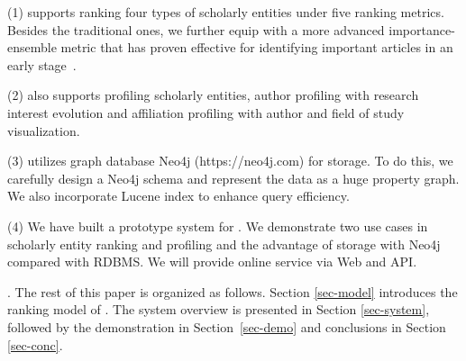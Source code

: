 \noindent (1) \oursystem supports ranking four types of scholarly entities under five ranking metrics. Besides the traditional ones, we further equip \oursystem with a more advanced importance-ensemble metric that has proven effective for identifying important articles in an early stage~\cite{ma2018query}.

\noindent (2) \oursystem also supports profiling scholarly entities, \eg author profiling with research interest evolution and affiliation profiling with author and field of study visualization.

\noindent  (3) \oursystem utilizes graph database Neo4j {\scriptsize (https://neo4j.com)} for storage. To do this, we carefully design a Neo4j schema and represent the data as a huge property graph. We also incorporate Lucene index to enhance query efficiency.

\noindent (4) We have built a prototype system for \oursystem. We demonstrate two use cases in scholarly entity ranking and profiling and the advantage of storage with Neo4j compared with RDBMS. We will provide online service via Web and API.



.
The rest of this paper is organized as follows. Section \ref{sec-model} introduces the ranking model of \oursystem. The system overview is presented in Section \ref{sec-system}, followed by the demonstration in Section~\ref{sec-demo} and conclusions in Section \ref{sec-conc}.
